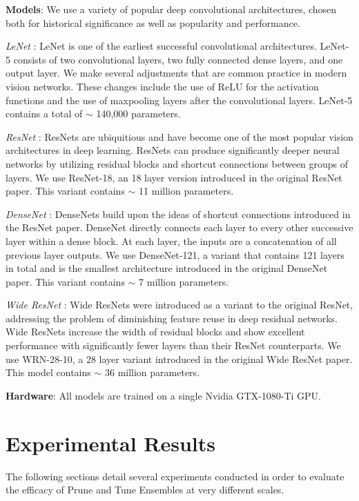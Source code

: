 \documentclass[letterpaper]{article} %
\begin{document}
\textbf{Models}: We use a variety of popular deep convolutional architectures, chosen both for historical significance as well as popularity and performance.

\textit{LeNet} \cite{lecun1989backpropagation}: LeNet is one of the earliest successful convolutional architectures. LeNet-5 consists of two convolutional layers, two fully connected dense layers, and one output layer.
We make several adjustments that are common practice in modern vision networks. These changes include the use of ReLU for the activation functions and the use of maxpooling layers after the convolutional layers. LeNet-5 contains a total of $\sim$ 140,000 parameters.

\textit{ResNet} \cite{he2015deep}: ResNets are ubiquitious and have become one of the most popular vision architectures in deep learning. ResNets can produce significantly deeper neural networks by utilizing residual blocks and shortcut connections between groups of layers. We use ResNet-18, an 18 layer version introduced in the original ResNet paper. This variant contains $\sim$ 11 million parameters.

\textit{DenseNet} \cite{huang2018densely}: DenseNets build upon the ideas of shortcut connections introduced in the ResNet paper. DenseNet directly connects each layer to every other successive layer within a dense block. At each layer, the inputs are a concatenation of all previous layer outputs. We use DenseNet-121, a variant that contains 121 layers in total and is the smallest architecture introduced in the original DenseNet paper. This variant contains  $\sim$ 7 million parameters.

\textit{Wide ResNet} \cite{zagoruyko2017wide}: Wide ResNets were introduced as a variant to the original ResNet, addressing the problem of diminishing feature reuse in deep residual networks. Wide ResNets increase the width of residual blocks and show excellent performance with significantly fewer layers than their ResNet counterparts. We use WRN-28-10, a 28 layer variant introduced in the original Wide ResNet paper. This model contains $\sim$ 36 million parameters.

\textbf{Hardware}: All models are trained on a single Nvidia GTX-1080-Ti GPU.

\section{Experimental Results}

The following sections detail several experiments conducted in order to evaluate the efficacy of Prune and Tune Ensembles at very different scales.
\end{document}
